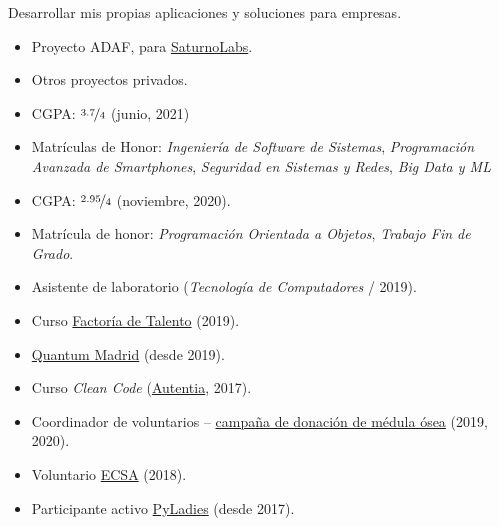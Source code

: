 \documentclass[10pt,a4paper,ragged2e]{altacv}
\begin{document}
Desarrollar mis propias aplicaciones y soluciones para empresas.
\begin{itemize}
  \item Proyecto ADAF, para \href{https://saturnolabs.com/}{SaturnoLabs}.
  \item Otros proyectos privados.
\end{itemize}

\begin{itemize}
  \item CGPA: $\nicefrac{3.7}{4}$ (junio, 2021)
  \item Matrículas de Honor: \textit{Ingeniería de Software de Sistemas}, \textit{Programación Avanzada de Smartphones}, \textit{Seguridad en Sistemas y Redes}, \textit{Big Data y ML}
\end{itemize}

\divider

\begin{itemize}
    \item CGPA: $\nicefrac{2.95}{4}$ (noviembre, 2020).
    \item Matrícula de honor: \textit{Programación Orientada a Objetos}, \textit{Trabajo Fin de Grado}.
    \item Asistente de laboratorio (\textit{Tecnología de Computadores} / 2019).
\end{itemize}

\divider

\begin{itemize}
  \item Curso \href{https://factoriatalento.es/}{Factoría de Talento} (2019).
  \item \href{https://www.meetup.com/es-ES/quantummadrid/}{Quantum Madrid} (desde 2019).
  \item Curso \textit{Clean Code} (\href{https://www.autentia.com/}{Autentia}, 2017).
  \item Coordinador de voluntarios -- \href{https://www.upm.es/e-politecnica/?p=11246}{campaña de donación de médula ósea} (2019, 2020).
  \item Voluntario \href{https://eventos.upm.es/12427/detail/european-conference-on-software-architectures-2018-ecsa18.html}{ECSA} (2018).
  \item Participante activo \href{http://madrid.pyladies.com/}{PyLadies} (desde 2017).
\end{itemize}
\end{document}
